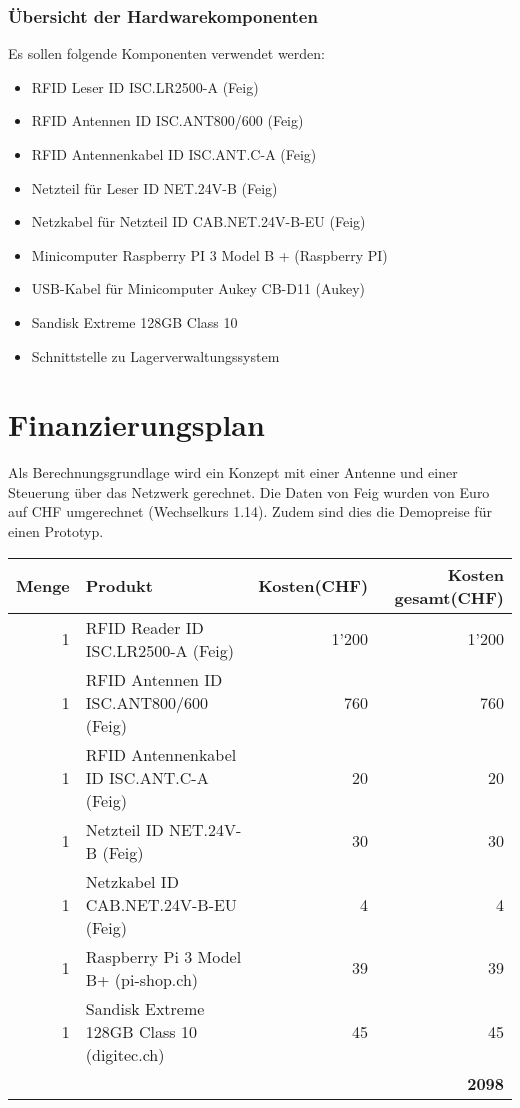 \subsection{Übersicht der Hardwarekomponenten}
Es sollen folgende Komponenten verwendet werden:
\begin{itemize}
	\item RFID Leser ID ISC.LR2500-A  (Feig)
	\item RFID Antennen ID ISC.ANT800/600 (Feig)
	\item RFID Antennenkabel ID ISC.ANT.C-A (Feig)
	\item Netzteil für Leser ID NET.24V-B (Feig)
	\item Netzkabel für Netzteil ID CAB.NET.24V-B-EU  (Feig)
	\item Minicomputer Raspberry PI 3 Model B + (Raspberry PI)
	\item USB-Kabel für Minicomputer Aukey CB-D11 (Aukey)
	\item Sandisk Extreme 128GB Class 10
	\item Schnittstelle zu Lagerverwaltungssystem
\end{itemize}

\chapter{Finanzierungsplan}

Als Berechnungsgrundlage wird ein Konzept mit einer Antenne und einer Steuerung über das Netzwerk gerechnet. Die Daten von Feig wurden von Euro auf CHF umgerechnet (Wechselkurs 1.14). Zudem sind dies die Demopreise für einen Prototyp.

\vspace{1em}

\begin{tabularx}{\textwidth}{|r|X|r|r|}
	\hline 
	\textbf{Menge} & \textbf{Produkt} & \textbf{Kosten(CHF)} & \textbf{Kosten gesamt(CHF)} \\
	\hline 
	1 & RFID Reader ID ISC.LR2500-A (Feig) & 1'200 & 1'200 \\ 
	\hline 
	1 & RFID Antennen ID ISC.ANT800/600 (Feig)& 760 & 760 \\
	\hline
	1 & RFID Antennenkabel ID ISC.ANT.C-A (Feig) & 20 & 20 \\
	\hline
	1 & Netzteil ID NET.24V-B (Feig) & 30 & 30 \\
	\hline
	1 & Netzkabel ID CAB.NET.24V-B-EU (Feig) & 4 & 4 \\
	\hline
	1 & Raspberry Pi 3 Model B+ (pi-shop.ch)& 39 & 39 \\
	\hline
	1 & Sandisk Extreme 128GB Class 10 (digitec.ch)& 45 & 45 \\
	\hline
	& & & \textbf{2098} \\
	\hline
\end{tabularx} 
